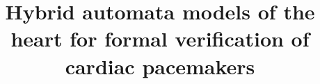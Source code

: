 \documentclass[conference]{IEEEtran}
\begin{document}
	
		\renewcommand\floatpagefraction{.9}
		\renewcommand\dblfloatpagefraction{.95} %
		\renewcommand\topfraction{.95}
		\renewcommand\dbltopfraction{.95} %
		\renewcommand\bottomfraction{.95}
		\renewcommand\textfraction{.1}   
		\setcounter{totalnumber}{50}
		\setcounter{topnumber}{50}
		\setcounter{bottomnumber}{50}
		
		\setlength{\abovecaptionskip}{0pt}
		
		
	
\title{Hybrid automata models of the heart for formal verification of cardiac pacemakers \vspace{-0.5cm} }

\author{

	\vspace{-1cm}
}





\maketitle


















 
\end{document}
